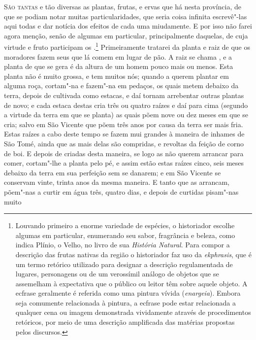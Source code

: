 \noindent\textsc{São tantas} e tão diversas as plantas, frutas, e ervas que há nesta
província, de que se podiam notar muitas particularidades, que seria
coisa infinita escrevê"-las aqui todas e dar notícia dos efeitos de cada
uma miudamente. E por isso não farei agora menção, senão de algumas em
particular, principalmente daquelas, de cuja virtude e fruto
participam os .\footnote{ Louvando primeiro a enorme
variedade de espécies, o historiador escolhe algumas em particular, 
enumerando seu sabor, fragrância e beleza, como indica Plínio, o
Velho, no livro  de sua \textit{História Natural}. 
Para compor a descrição das frutas nativas da região o historiador faz uso da
\textit{ekphrasis}, que é um termo retórico utilizado para designar a
descrição regulamentada de lugares, personagens ou de um verossímil
análogo de objetos que se assemelham à expectativa que o público ou
leitor têm sobre aquele objeto. A ecfrase geralmente é referida como
uma pintura vívida (\textit{enargeia}). Embora seja comumente
relacionada à pintura, a ecfrase pode estar relacionada a
qualquer cena ou imagem demonstrada vividamente através de
procedimentos retóricos, por meio de uma descrição amplificada das
matérias propostas pelos discursos.} Primeiramente tratarei da planta e
raiz de que os moradores fazem seus  que lá comem em lugar
de pão. A raiz se chama , 
e a planta de que se gera é da altura de um homem pouco mais ou menos. 
Esta planta não é muito grossa,
e tem muitos nós; quando a querem plantar em alguma roça, cortam"-na e			%
fazem"-na em pedaços, os quais metem debaixo da terra, depois de
cultivada como estacas, e daí tornam arrebentar outras plantas de novo;
e cada estaca destas cria três ou quatro raízes e daí para cima
(segundo a virtude da terra em que se planta) as quais põem nove ou dez
meses em que se cria; salvo em São Vicente que põem três anos por causa			%
da terra ser mais fria. Estas raízes a cabo deste tempo se fazem mui
grandes à maneira de inhames de São Tomé, ainda que as mais delas são			%
compridas, e revoltas da feição de corno de boi. E depois de criadas
desta maneira, se logo as não querem arrancar para comer, cortam"-lhe a
planta pelo pé, e assim estão estas raízes cinco, seis meses debaixo da
terra em sua perfeição sem se danarem; e em São Vicente se conservam			%
vinte, trinta anos da mesma maneira. E tanto que as arrancam, põem"-nas
a curtir em água três, quatro dias, e depois de curtidas pisam"-nas muito
